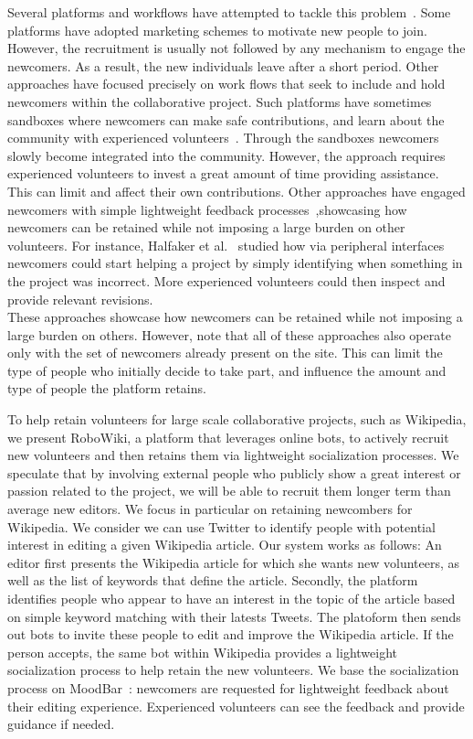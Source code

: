 \documentclass{sigchi}
\begin{document}
Several platforms and workflows have attempted to tackle this problem~\cite{ciampaglia2015moodbar,halfaker2013making,morgan2013tea}. Some platforms have adopted  marketing schemes to motivate new people to join. However, the recruitment is usually not followed by any mechanism to engage the newcomers. As a result, the new individuals leave after a short period. Other approaches have focused precisely on work flows that seek to include and hold newcomers within the collaborative project.  Such platforms have sometimes sandboxes where newcomers can make safe contributions, and learn about the community with experienced volunteers~\cite{morgan2013tea}. Through the sandboxes newcomers slowly become integrated into the community. However, the approach requires experienced volunteers to invest a great amount of time providing assistance. This can limit and affect their own contributions.  Other approaches have engaged newcomers with simple lightweight feedback processes~\cite{ciampaglia2015moodbar},showcasing  how newcomers can be retained while not imposing a large burden on other volunteers. For instance, Halfaker et al.~\cite{halfaker2013making} studied how via peripheral interfaces newcomers could start helping a project by simply identifying when something in the project was incorrect. More experienced volunteers could then inspect and provide relevant revisions.\\ These approaches showcase how newcomers can be retained while not imposing a large burden on others. However, note that all of these approaches also operate only with the set of newcomers already present on the site. This can limit the type of people who initially decide to take part, and influence the amount and type of people the platform retains. 

To help retain volunteers for large scale collaborative projects, such as Wikipedia, we present RoboWiki, a platform that leverages online bots, to actively recruit  new volunteers and then retains them via lightweight socialization processes. We speculate that by involving external people who publicly show a great interest or passion related to the project, we will be able to recruit them longer term than average new editors. We focus in particular on retaining newcombers for Wikipedia. We consider we can use Twitter to identify people with potential interest in editing a given Wikipedia article.  
Our system works as follows: An editor first presents the Wikipedia article for which she wants new volunteers, as well as the list of keywords that define the article. Secondly, the platform identifies people who appear to have an interest in the topic of the article based on simple keyword matching with their latests Tweets. The platoform then sends out bots to invite these people to edit and improve the Wikipedia article. If the person accepts, the same bot within Wikipedia provides a lightweight socialization process to help retain the new volunteers. We base the socialization process on MoodBar~\cite{ciampaglia2015moodbar}: newcomers  are requested for lightweight feedback about their editing experience. Experienced volunteers can see the feedback and provide guidance if needed. 
\end{document}

